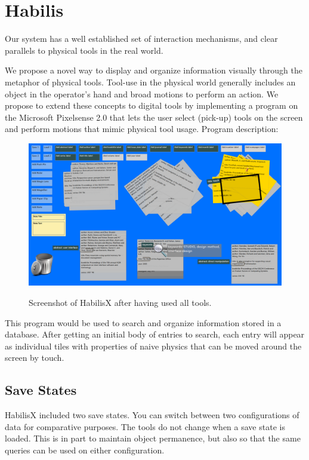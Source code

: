 \documentclass{article}
\begin{document}
\section{Habilis}


Our system has a well established set of interaction mechanisms, and clear parallels to physical tools in the real world.

We propose a novel way to display and organize information visually through the metaphor of physical tools. Tool-use in the physical world generally includes an object in the operator's hand and broad motions to perform an action. We propose to extend these concepts to digital tools by implementing a program on the Microsoft Pixelsense 2.0 that lets the user select (pick-up) tools on the screen and perform motions that mimic physical tool usage. 
Program description:

\begin{figure}[t!]
\centering
\scalebox{.239}
{\includegraphics{HabilisScreenShot.png}}
\caption{Screenshot of HabilisX after having used all tools.}
\label{Fig:screenshot}
\end{figure}



This program would be used to search and organize information stored in a database.  After getting an initial body of entries to search, each entry will appear as individual tiles with properties of naive physics that can be moved around the screen by touch. 






\subsection{Save States}
HabilisX included two save states.  You can switch between two configurations of data for comparative purposes.  The tools do not change when a save state is loaded.  This is in part to maintain object permanence, but also so that the same queries can be used on either configuration.  
\end{document}
